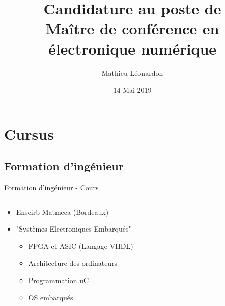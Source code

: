 \documentclass[t,compress,mathserif,12pt,xcolor=dvipsnames]{beamer}
\title{\textbf{Candidature au poste de \\ Maître de conférence en électronique numérique}}
\author[Mathieu Léonardon\hspace{3.01cm}\url{https://mathieuleonardon.com}\hspace{1.0cm}{mathieu.leonardon@ims-bordeaux.fr}]{\Large{Mathieu Léonardon}\vspace{-0.5cm}}
\date{14 Mai 2019}
\begin{document}
\begin{frame}[t]
\titlepage
\end{frame}

\section{Cursus}
\subsection{Formation d'ingénieur}
\begin{frame}[t]{Formation d'ingénieur - Cours}
  \begin{minipage}[t][5.0cm][t]{\textwidth}
    \begin{columns}[T]
      \begin{column}{0.63\textwidth}
        \begin{itemize}
          \item<+-> Enseirb-Matmeca (Bordeaux)
          \item<+-> "Systèmes Electroniques Embarqués"
          \begin{itemize}
            \item<+-> FPGA et ASIC (Langage VHDL)
            \item<+-> Architecture des ordinateurs
            \item<+-> Programmation uC
            \item<+-> OS embarqués
          \end{itemize}
        \end{itemize}
      \end{column}
      \begin{column}{0.04\textwidth}


\end{column}
\end{columns}
\end{minipage}
\end{frame}
\end{document}
